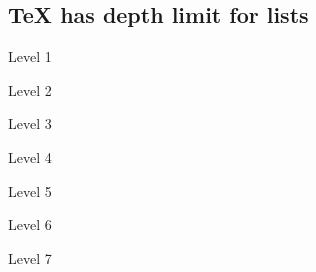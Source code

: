 
\subsection*{TeX has depth limit for lists}

\begin{compactitem}
\item Level 1
  \begin{compactitem}
  \item Level 2
    \begin{compactitem}
    \item Level 3
      \begin{compactitem}
      \item Level 4
      \item Level 5
      \item Level 6
      \item Level 7
      \end{compactitem}
    \end{compactitem}
  \end{compactitem}
\end{compactitem}

